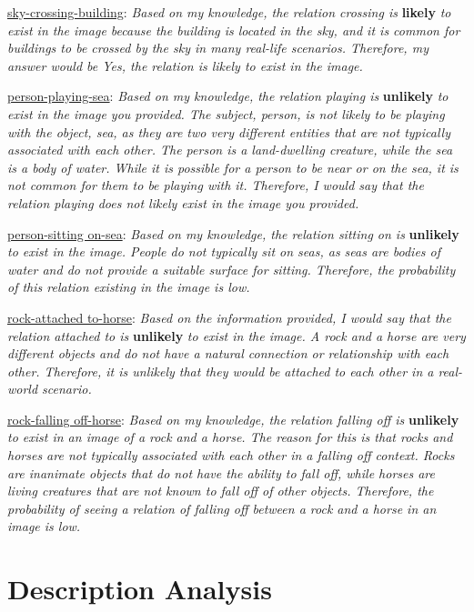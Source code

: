 \underline{sky-crossing-building}: \textit{Based on my knowledge, the relation crossing is} \textbf{likely} \textit{to exist in the image because the building is located in the sky, and it is common for buildings to be crossed by the sky in many real-life scenarios. Therefore, my answer would be Yes, the relation is likely to exist in the image.}

\underline{person-playing-sea}: \textit{Based on my knowledge, the relation playing is} \textbf{unlikely} \textit{to exist in the image you provided. The subject, person, is not likely to be playing with the object, sea, as they are two very different entities that are not typically associated with each other. The person is a land-dwelling creature, while the sea is a body of water. While it is possible for a person to be near or on the sea, it is not common for them to be playing with it. Therefore, I would say that the relation playing does not likely exist in the image you provided.}

\underline{person-sitting on-sea}: \textit{Based on my knowledge, the relation sitting on is} \textbf{unlikely} \textit{to exist in the image. People do not typically sit on seas, as seas are bodies of water and do not provide a suitable surface for sitting. Therefore, the probability of this relation existing in the image is low.}

\underline{rock-attached to-horse}: \textit{Based on the information provided, I would say that the relation attached to is} \textbf{unlikely} \textit{to exist in the image. A rock and a horse are very different objects and do not have a natural connection or relationship with each other. Therefore, it is unlikely that they would be attached to each other in a real-world scenario.}

\underline{rock-falling off-horse}: \textit{Based on my knowledge, the relation falling off is} \textbf{unlikely} \textit{to exist in an image of a rock and a horse. The reason for this is that rocks and horses are not typically associated with each other in a falling off context. Rocks are inanimate objects that do not have the ability to fall off, while horses are living creatures that are not known to fall off of other objects. Therefore, the probability of seeing a relation of falling off between a rock and a horse in an image is low.}


\section{Description Analysis}
\label{sec:analysis_llm}

